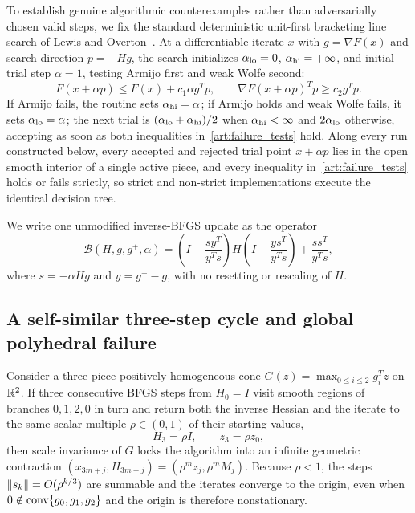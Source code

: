 To establish genuine algorithmic counterexamples rather than adversarially
chosen valid steps, we fix the standard deterministic unit-first bracketing line
search of Lewis and Overton~\cite[Algorithm~4.6]{LO}. At a differentiable
iterate $x$ with $g=\nabla F(x)$ and search direction $p=-Hg$, the search
initializes $\alpha_{\rm lo}=0$, $\alpha_{\rm hi}=+\infty$, and initial trial
step $\alpha=1$, testing Armijo first and weak Wolfe second:
\begin{equation}\label{art:failure_tests}
 F(x+\alpha p)\le F(x)+c_1\alpha g^Tp,
 \qquad \nabla F(x+\alpha p)^Tp\ge c_2g^Tp.
\end{equation}
If Armijo fails, the routine sets $\alpha_{\rm hi}=\alpha$; if Armijo holds and
weak Wolfe fails, it sets $\alpha_{\rm lo}=\alpha$; the next trial is
$(\alpha_{\rm lo}+\alpha_{\rm hi})/2$ when $\alpha_{\rm hi}<\infty$ and
$2\alpha_{\rm lo}$ otherwise, accepting as soon as both inequalities
in~\eqref{art:failure_tests} hold. Along every run constructed below, every
accepted and rejected trial point $x+\alpha p$ lies in the open smooth interior
of a single active piece, and every inequality in~\eqref{art:failure_tests}
holds or fails strictly, so strict and non-strict implementations execute the
identical decision tree.

We write one unmodified inverse-BFGS update as the operator
\begin{equation}\label{art:failure_update}
 \mathcal B(H,g,g^+,\alpha)
 =\left(I-\frac{sy^T}{y^Ts}\right)H
  \left(I-\frac{ys^T}{y^Ts}\right)+\frac{ss^T}{y^Ts},
\end{equation}
where $s=-\alpha Hg$ and $y=g^+-g$, with no resetting or rescaling of $H$.

\subsection{A self-similar three-step cycle and global polyhedral failure}

Consider a three-piece positively homogeneous cone
$G(z)=\max_{0\le i\le2}g_i^Tz$ on $\mathbb R^2$. If three consecutive BFGS steps from
$H_0=I$ visit smooth regions of branches $0,1,2,0$ in turn and return both the
inverse Hessian and the iterate to the same scalar multiple $\rho\in(0,1)$ of
their starting values,
\[
 H_3=\rho I,\qquad z_3=\rho z_0,
\]
then scale invariance of $G$ locks the algorithm into an infinite geometric
contraction $(x_{3m+j},H_{3m+j})=(\rho^mz_j,\rho^mM_j)$. Because $\rho<1$, the steps $\lVert s_k\rVert=O(\rho^{k/3})$ are summable and the
iterates converge to the origin, even when $0\notin\operatorname{conv}\{g_0,g_1,g_2\}$ and the
origin is therefore nonstationary.

